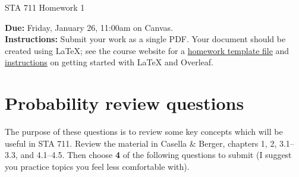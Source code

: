 \documentclass[11pt]{article}
\begin{document}
\begin{center}
\Large
STA 711 Homework 1\\
\normalsize
\vspace{5mm}
\end{center}

\noindent \textbf{Due:} Friday, January 26, 11:00am on Canvas.\\ 

\noindent \textbf{Instructions:} Submit your work as a single PDF. Your document should be created using LaTeX; see the course website for a \href{https://sta711-s24.github.io/homework/hw_template.tex}{homework template file} and \href{https://sta711-s24.github.io/homework/latex_instructions/}{instructions} on getting started with LaTeX and Overleaf.

\section{Probability review questions}

The purpose of these questions is to review some key concepts which will be useful in STA 711. Review the material in Casella \& Berger, chapters 1, 2, 3.1--3.3, and 4.1--4.5. Then choose \textbf{4} of the following questions to submit (I suggest you practice topics you feel less comfortable with).
\end{document}
